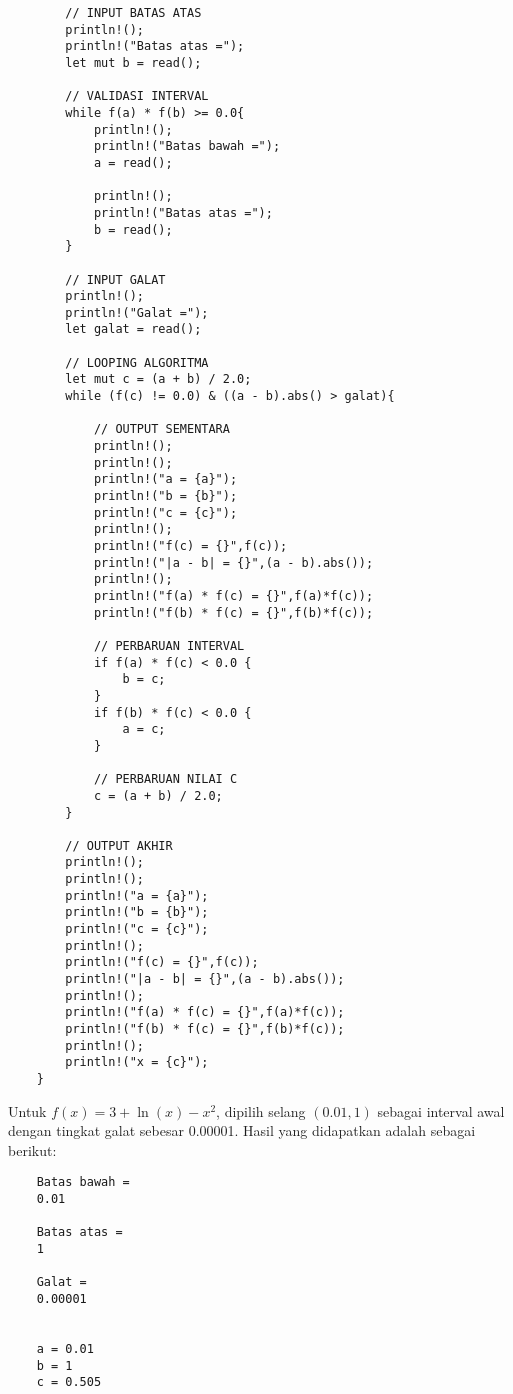 \documentclass[12pt]{article}
\begin{document}
\begin{enumerate}
{\begin{lstlisting}
        // INPUT BATAS ATAS
        println!();
        println!("Batas atas =");
        let mut b = read();

        // VALIDASI INTERVAL
        while f(a) * f(b) >= 0.0{
            println!();
            println!("Batas bawah =");
            a = read();

            println!();
            println!("Batas atas =");
            b = read();
        }

        // INPUT GALAT
        println!();
        println!("Galat =");
        let galat = read();
        
        // LOOPING ALGORITMA
        let mut c = (a + b) / 2.0;
        while (f(c) != 0.0) & ((a - b).abs() > galat){

            // OUTPUT SEMENTARA
            println!();
            println!();
            println!("a = {a}");
            println!("b = {b}");
            println!("c = {c}");
            println!();
            println!("f(c) = {}",f(c));
            println!("|a - b| = {}",(a - b).abs());
            println!();
            println!("f(a) * f(c) = {}",f(a)*f(c));
            println!("f(b) * f(c) = {}",f(b)*f(c));
            
            // PERBARUAN INTERVAL
            if f(a) * f(c) < 0.0 {
                b = c;
            }
            if f(b) * f(c) < 0.0 {
                a = c;
            }
            
            // PERBARUAN NILAI C
            c = (a + b) / 2.0;
        }

        // OUTPUT AKHIR
        println!();
        println!();
        println!("a = {a}");
        println!("b = {b}");
        println!("c = {c}");
        println!();
        println!("f(c) = {}",f(c));
        println!("|a - b| = {}",(a - b).abs());
        println!();
        println!("f(a) * f(c) = {}",f(a)*f(c));
        println!("f(b) * f(c) = {}",f(b)*f(c));
        println!();
        println!("x = {c}");
    }            
        \end{lstlisting}

        Untuk $ f(x) = 3 + \ln(x) - x^2 $, dipilih selang $ (0.01,1) $ sebagai interval awal dengan tingkat galat sebesar 0.00001. Hasil yang didapatkan adalah sebagai berikut:
        \begin{lstlisting}
    Batas bawah =
    0.01

    Batas atas =
    1

    Galat =
    0.00001


    a = 0.01
    b = 1
    c = 0.505


\end{lstlisting}}
\end{enumerate}
\end{document}
